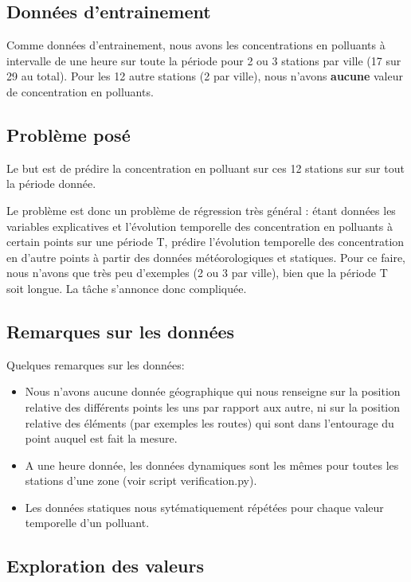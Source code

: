 \subsection{Données d'entrainement}

Comme données d'entrainement, nous avons les concentrations en polluants à intervalle de une heure sur toute la période pour 2 ou 3 stations par ville (17 sur 29 au total).
Pour les 12 autre stations (2 par ville), nous n'avons \textbf{aucune} valeur de concentration en polluants.

\subsection{Problème posé}

Le but est de prédire la concentration en polluant sur ces 12 stations sur sur tout la période donnée.

Le problème est donc un problème de régression très général : étant données les variables explicatives et l'évolution temporelle des concentration en polluants à certain points sur une période T, prédire l'évolution temporelle des concentration en d'autre points à partir des données météorologiques et statiques.
Pour ce faire, nous n'avons que très peu d'exemples (2 ou 3 par ville), bien que la période T soit longue.
La tâche s'annonce donc compliquée.

\subsection{Remarques sur les données}
Quelques remarques sur les données:
\begin{itemize}
  \item
    Nous n'avons aucune donnée géographique qui nous renseigne sur la position relative des différents points les uns par rapport aux autre, ni sur la position relative des éléments (par exemples les routes) qui sont dans l'entourage du point auquel est fait la mesure.
  \item
    A une heure donnée, les données dynamiques sont les mêmes pour toutes les stations d'une zone (voir script verification.py).
  \item
   Les données statiques nous sytématiquement répétées pour chaque valeur temporelle d'un polluant.
\end{itemize}

\subsection{Exploration des valeurs}
